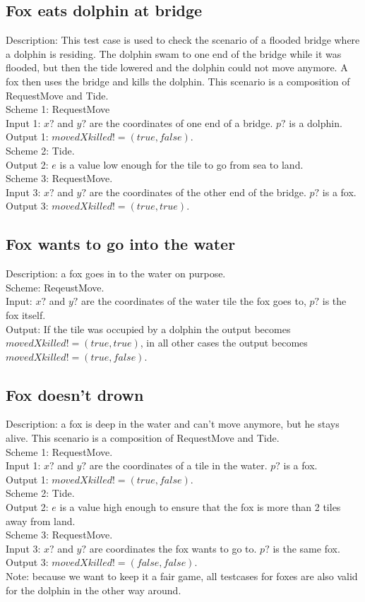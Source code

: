 \documentclass[a4paper,11pt]{article}
\begin{document}
    \subsection{Fox eats dolphin at bridge}
    Description: This test case is used to check the scenario of a flooded bridge where a dolphin is residing. The dolphin swam to one end of the bridge while it was flooded, but then the tide lowered and the dolphin could not move anymore. A fox then uses the bridge and kills the dolphin. This scenario is a composition of RequestMove and Tide.\\
    Scheme 1: RequestMove\\
    Input 1: $x?$ and $y?$ are the coordinates of one end of a bridge. $p?$ is a dolphin.\\
    Output 1: $movedXkilled! = (true,false)$.\\
    Scheme 2: Tide.\\
    Output 2: $e$ is a value low enough for the tile to go from sea to land.\\
    Scheme 3: RequestMove.\\
    Input 3: $x?$ and $y?$ are the coordinates of the other end of the bridge. $p?$ is a fox.\\
    Output 3: $movedXkilled! = (true,true)$.\\
    
    \subsection{Fox wants to go into the water}
    Description: a fox goes in to the water on purpose.\\
    Scheme: ReqeustMove.\\
    Input: $x?$ and $y?$ are the coordinates of the water tile the fox goes to, $p?$ is the fox itself.\\
    Output: If the tile was occupied by a dolphin the output becomes $movedXkilled! = (true,true)$, in all other cases the output becomes $movedXkilled! = (true,false)$.

    \subsection{Fox doesn't drown}
    Description: a fox is deep in the water and can't move anymore, but he stays alive. This scenario is a composition of RequestMove and Tide.\\
    Scheme 1: RequestMove.\\
    Input 1: $x?$ and $y?$ are the coordinates of a tile in the water. $p?$ is a fox.\\
    Output 1: $movedXkilled! = (true,false)$.\\
    Scheme 2: Tide.\\
    Output 2: $e$ is a value high enough to ensure that the fox is more than 2 tiles away from land.\\
    Scheme 3: RequestMove.\\
    Input 3: $x?$ and $y?$ are coordinates the fox wants to go to. $p?$ is the same fox.\\
    Output 3: $movedXkilled! = (false,false)$.\\


    Note: because we want to keep it a fair game, all testcases for foxes are also valid for the dolphin in the other way around.\\
\end{document}

